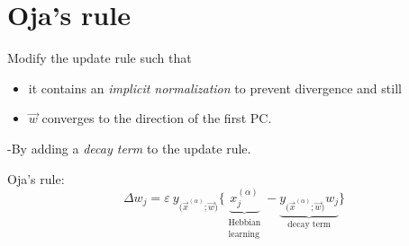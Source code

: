 \section{Oja's rule}


\begin{frame}{\secname}

Modify the update rule such that 
\begin{itemize}
\item it contains an 
\emph{implicit normalization} to prevent divergence and 
still 
\item $\vec w$ converges to the direction of the first PC.
\end{itemize}


-By adding a \emph{decay term} to the update rule.

\begin{block}{Oja's rule:}
\begin{equation}
	\Delta {w}_j = \varepsilon~y_{ \big( \vec{x}^{(\alpha)}; \vec{w}
		\big) } \bigg\{ 
			\underbrace{ x_j^{(\alpha)} }_{
				\substack{	\text{Hebbian} \\
						\text{learning} }}
			- 
					\underbrace{
	y_{ \big( \vec{x}^{(\alpha)}; \vec{w} \big) } {w}_j
	}_{\text{decay term}}
			\bigg\}
\end{equation}
\end{block}

\end{frame}

